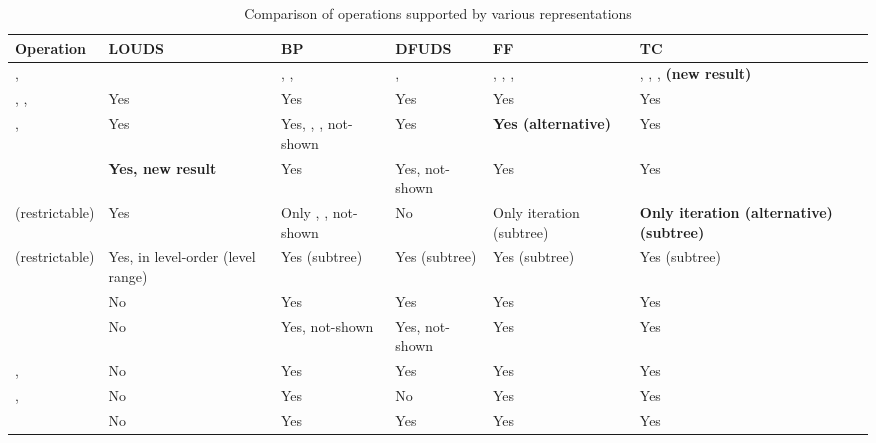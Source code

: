 \begin{sidewaystable}
	\centering
	\begin{tabularx}{\textwidth}{|L{1}||L{1}|L{1}|L{1}|L{1}|L{1}|}
		\hline
		Operation
		& LOUDS
		& BP
		& DFUDS
		& FF
		& TC
		\\ \hline \hline

		\anyRank{}, \newline
		\anySelect{}
		& \loAny{}
		& \preAny{}, \postAny{}, \inAny{}
		& \preAny{}, \dfudsAny{}
		& \preAny{}, \postAny{}, \dfudsAny{}, \inAny{}
		& \preAny{}, \postAny{}, \dfudsAny{}, \textbf{\inAny{} (new result)}
		\\ \hline
		
		\parent{}, \isRoot{}, \isLeaf{}
		& Yes
		& Yes
		& Yes
		& Yes
		& Yes
		\\ \hline
		
		\childAny{}, \degree{}
		& Yes
		& Yes, \childRank{}, \childSelect{}, \degree{} not-shown
		& Yes
		& \textbf{Yes (alternative)}
		& Yes
		\\ \hline
		
		\dep{}
		& \textbf{Yes, new result}
		& Yes
		& Yes, not-shown
		& Yes
		& Yes
		\\ \hline
	
		\levelAny{} (restrictable)
		& Yes
		& Only \levelPrev{}, \levelNext{}, not-shown
		& No
		& Only iteration (subtree)
		& \textbf{Only iteration (alternative) (subtree)}
		\\ \hline
		
		\leafAny{} (restrictable)
		& Yes, in level-order (level range)
		& Yes (subtree)
		& Yes (subtree)
		& Yes (subtree)
		& Yes (subtree)
		\\ \hline
		
		\isAncestor{}
		& No
		& Yes
		& Yes
		& Yes
		& Yes
		\\ \hline
		
		\levelAncestor{}
		& No
		& Yes, not-shown
		& Yes, not-shown
		& Yes
		& Yes
		\\ \hline
		
		\lca{}, \distance{}
		& No
		& Yes
		& Yes
		& Yes
		& Yes
		\\ \hline
		
		\hei{}, \deepestVertex{}
		& No
		& Yes
		& No
		& Yes
		& Yes
		\\ \hline
		
		\subtreeSize{}
		& No
		& Yes
		& Yes
		& Yes
		& Yes
		\\ \hline
	\end{tabularx}
	\caption{Comparison of operations supported by various representations}
	\label{tab:comparison}
\end{sidewaystable}


